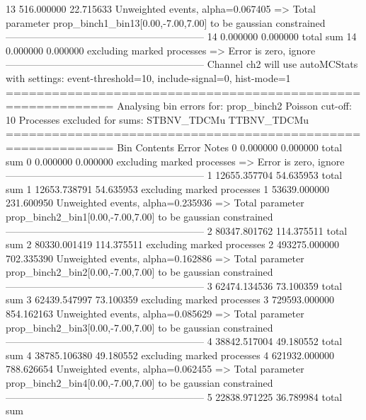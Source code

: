 13         516.000000      22.715633       Unweighted events, alpha=0.067405
  => Total parameter prop_binch1_bin13[0.00,-7.00,7.00] to be gaussian constrained
------------------------------------------------------------
14         0.000000        0.000000        total sum                     
14         0.000000        0.000000        excluding marked processes    
  => Error is zero, ignore      
------------------------------------------------------------
Channel ch2 will use autoMCStats with settings: event-threshold=10, include-signal=0, hist-mode=1
============================================================
Analysing bin errors for: prop_binch2
Poisson cut-off: 10
Processes excluded for sums: STBNV_TDCMu TTBNV_TDCMu
============================================================
Bin        Contents        Error           Notes                         
0          0.000000        0.000000        total sum                     
0          0.000000        0.000000        excluding marked processes    
  => Error is zero, ignore      
------------------------------------------------------------
1          12655.357704    54.635953       total sum                     
1          12653.738791    54.635953       excluding marked processes    
1          53639.000000    231.600950      Unweighted events, alpha=0.235936
  => Total parameter prop_binch2_bin1[0.00,-7.00,7.00] to be gaussian constrained
------------------------------------------------------------
2          80347.801762    114.375511      total sum                     
2          80330.001419    114.375511      excluding marked processes    
2          493275.000000   702.335390      Unweighted events, alpha=0.162886
  => Total parameter prop_binch2_bin2[0.00,-7.00,7.00] to be gaussian constrained
------------------------------------------------------------
3          62474.134536    73.100359       total sum                     
3          62439.547997    73.100359       excluding marked processes    
3          729593.000000   854.162163      Unweighted events, alpha=0.085629
  => Total parameter prop_binch2_bin3[0.00,-7.00,7.00] to be gaussian constrained
------------------------------------------------------------
4          38842.517004    49.180552       total sum                     
4          38785.106380    49.180552       excluding marked processes    
4          621932.000000   788.626654      Unweighted events, alpha=0.062455
  => Total parameter prop_binch2_bin4[0.00,-7.00,7.00] to be gaussian constrained
------------------------------------------------------------
5          22838.971225    36.789984       total sum                     
